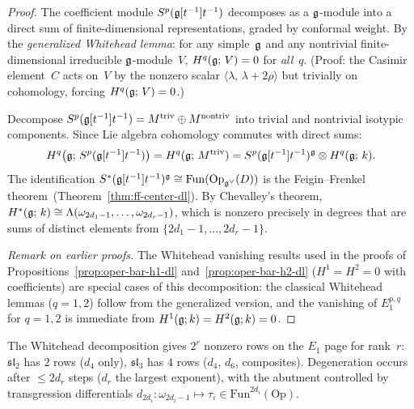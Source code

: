 \begin{proof}
The coefficient module $S^p(\mathfrak{g}[t^{-1}]t^{-1})$ decomposes
as a $\mathfrak{g}$-module into a direct sum of finite-dimensional
representations, graded by conformal weight.  By the
\emph{generalized Whitehead lemma}: for any simple~$\mathfrak{g}$ and any
nontrivial finite-dimensional irreducible $\mathfrak{g}$-module~$V$,
$H^q(\mathfrak{g};\, V) = 0$ for \emph{all}~$q$.  \textup{(}Proof: the
Casimir element~$C$ acts on~$V$ by the nonzero scalar
$\langle \lambda,\, \lambda + 2\rho\rangle$ but trivially on
cohomology, forcing $H^q(\mathfrak{g};\, V) = 0$.\textup{)}

Decompose $S^p(\mathfrak{g}[t^{-1}]t^{-1})
= M^{\mathrm{triv}} \oplus M^{\mathrm{nontriv}}$
into trivial and nontrivial isotypic components.  Since Lie
algebra cohomology commutes with direct sums:
\[
H^q\bigl(\mathfrak{g};\, S^p(\mathfrak{g}[t^{-1}]t^{-1})\bigr)
= H^q(\mathfrak{g};\, M^{\mathrm{triv}})
= S^p(\mathfrak{g}[t^{-1}]t^{-1})^{\mathfrak{g}} \otimes H^q(\mathfrak{g};\, k).
\]
The identification
$S^*(\mathfrak{g}[t^{-1}]t^{-1})^{\mathfrak{g}}
\cong \mathrm{Fun}(\mathrm{Op}_{\mathfrak{g}^\vee}(D))$
is the Feigin--Frenkel theorem~\textup{(}Theorem~\ref{thm:ff-center-dl}\textup{)}.
By Chevalley's theorem,
$H^*(\mathfrak{g};\, k) \cong
\Lambda(\omega_{2d_1-1}, \ldots, \omega_{2d_r-1})$, which is
nonzero precisely in degrees that are sums of distinct elements
from $\{2d_1 - 1, \ldots, 2d_r - 1\}$.

\emph{Remark on earlier proofs.}
The Whitehead vanishing results used in the proofs of
Propositions~\ref{prop:oper-bar-h1-dl}
and~\ref{prop:oper-bar-h2-dl} ($H^1 = H^2 = 0$ with
coefficients) are special cases of this decomposition: the
classical Whitehead lemmas ($q = 1, 2$) follow from the
generalized version, and the vanishing of $E_1^{p,q}$ for
$q = 1, 2$ is immediate from $H^1(\mathfrak{g}; k) = H^2(\mathfrak{g}; k) = 0$.
\end{proof}

\begin{remark}
\label{rem:spectral-by-rank}
The Whitehead decomposition gives $2^r$ nonzero rows on the $E_1$
page for rank~$r$: $\mathfrak{sl}_2$ has $2$ rows ($d_4$ only),
$\mathfrak{sl}_3$ has $4$ rows ($d_4$, $d_6$, composites).
Degeneration occurs after $\leq 2d_r$ steps ($d_r$ the largest
exponent), with the abutment controlled by transgression
differentials
$d_{2d_i}\colon \omega_{2d_i-1} \mapsto \tau_i \in
\mathrm{Fun}^{2d_i}(\mathrm{Op})$.
\end{remark}


